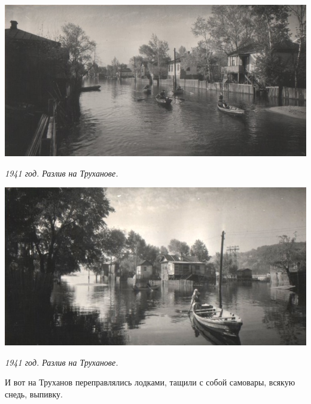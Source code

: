 


\vspace*{\fill}

\begin{center}
\includegraphics[width=\linewidth]{chast-gorodki/cherto/1941-truh-razl-1.jpg}

\textit{1941 год. Разлив на Труханове.}
\end{center}


\begin{center}
\includegraphics[width=\linewidth]{chast-gorodki/cherto/1941-truh-razl-2.jpg}

\textit{1941 год. Разлив на Труханове.}
\end{center}

\vspace*{\fill}

\newpage



И вот на Труханов переправлялись лодками, тащили с собой самовары, всякую снедь, выпивку.

